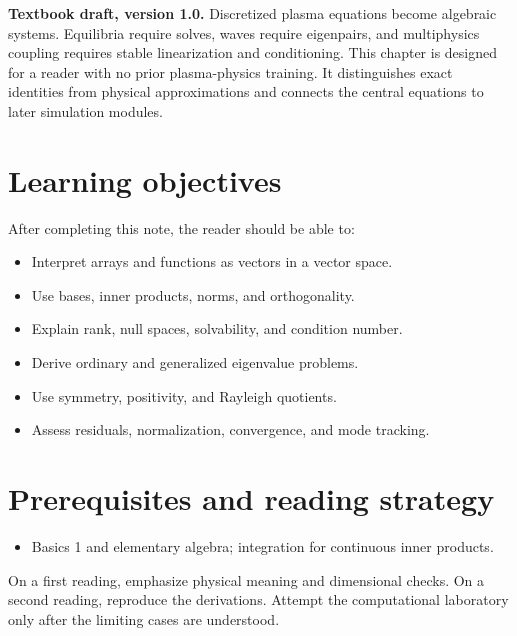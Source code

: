 \documentclass[11pt]{article}
\begin{document}

\begin{overviewbox}
\textbf{Textbook draft, version 1.0.} Discretized plasma equations become algebraic systems. Equilibria require solves, waves require eigenpairs, and multiphysics coupling requires stable linearization and conditioning. This chapter is designed for a reader with no prior plasma-physics training. It distinguishes exact identities from physical approximations and connects the central equations to later simulation modules.
\end{overviewbox}

\ProjectTOC

\section{Learning objectives}
After completing this note, the reader should be able to:
\begin{itemize}[leftmargin=1.6em]
\item Interpret arrays and functions as vectors in a vector space.
\item Use bases, inner products, norms, and orthogonality.
\item Explain rank, null spaces, solvability, and condition number.
\item Derive ordinary and generalized eigenvalue problems.
\item Use symmetry, positivity, and Rayleigh quotients.
\item Assess residuals, normalization, convergence, and mode tracking.
\end{itemize}

\section{Prerequisites and reading strategy}
\begin{itemize}[leftmargin=1.6em]
\item Basics 1 and elementary algebra; integration for continuous inner products.
\end{itemize}
On a first reading, emphasize physical meaning and dimensional checks. On a second reading, reproduce the derivations. Attempt the computational laboratory only after the limiting cases are understood.
\end{document}
